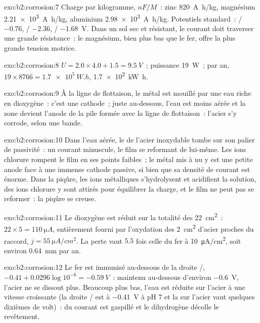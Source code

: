 \begin{solution}{exo:b2:corrosion:7}
Charge par kilogramme, $nF/M$~: zinc \qty{820}{A.h/kg}, magnésium \qty{2.21e3}{A.h/kg},
aluminium \qty{2.98e3}{A.h/kg}. Potentiels standard~: / $-0.76$,
/ $-2.36$, / \qty{-1.68}{V}. Dans un sol sec et résistant,
le courant doit traverser une grande résistance~: le magnésium, bien plus
bas que le fer, offre la plus grande tension motrice.
\end{solution}

\begin{solution}{exo:b2:corrosion:8}
$U = 2.0 \times 4.0 + 1.5 = \qty{9.5}{V}$~; puissance \qty{19}{W}~; par an, $19 \times
8766 = \qty{1.7e5}{W.h}$, \qty{1.7e2}{kW.h}.
\end{solution}

\begin{solution}{exo:b2:corrosion:9}
À la ligne de flottaison, le métal est mouillé par une eau riche en dioxygène~: c'est une cathode~; juste
au-dessous, l'eau est moins aérée et la zone devient l'anode de la pile
formée avec la ligne de flottaison~: l'acier s'y corrode, selon une bande.
\end{solution}

\begin{solution}{exo:b2:corrosion:10}
Dans l'eau aérée, le  de l'acier inoxydable tombe sur son
palier de passivité~: un courant minuscule, le film se reformant de lui-même. Les ions chlorure rompent
le film en ses points faibles~; le métal mis à nu y est une petite anode face à une
immense cathode passive, si bien que sa densité de courant est énorme. Dans la piqûre, les
ions métalliques s'hydrolysent et acidifient la solution, des ions chlorure y sont attirés pour équilibrer
la charge, et le film ne peut pas se reformer~: la piqûre se creuse.
\end{solution}

\begin{solution}{exo:b2:corrosion:11}
Le dioxygène est réduit sur la totalité des \qty{22}{cm^2}~:  $22 \times 5 =
\qty{110}{\micro A}$, entièrement fourni par l'oxydation des \qty{2}{cm^2} d'acier
proches du raccord, $j = \qty{55}{\micro A/cm^2}$. La perte vaut $5.5$ fois celle du fer
à \qty{10}{\micro A/cm^2}, soit environ \qty{0.64}{mm} par an.
\end{solution}

\begin{solution}{exo:b2:corrosion:12}
Le fer est immunisé au-dessous de la droite /, $-0.41 + 0.0296\log 10^{-6} =
\qty{-0.59}{V}$~: maintenu au-dessous d'environ \qty{-0.6}{V}, l'acier ne se dissout plus. Beaucoup
plus bas, l'eau est réduite sur l'acier à une vitesse croissante (la droite / est à
\qty{-0.41}{V} à pH 7 et la  sur l'acier vaut quelques dixièmes de volt)~:
du courant est gaspillé et le dihydrogène décolle le revêtement.
\end{solution}

